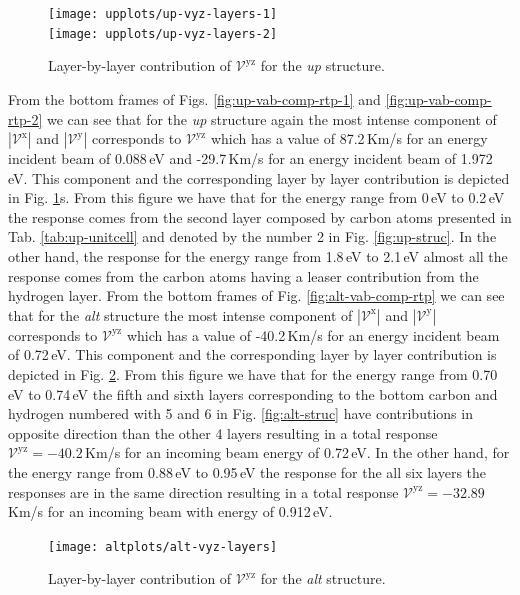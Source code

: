 \documentclass[prb,11pt,tightenlines,twocolumn,aps]{revtex4-1}
\begin{document}
\begin{figure}[t]
    \centering
    \texttt{[image: upplots/up-vyz-layers-1]}
    \label{fig:up-vyz-lay-1}
    \\
    \texttt{[image: upplots/up-vyz-layers-2]}
    \label{fig:up-vyz-lay-2}
    
    \caption{Layer-by-layer contribution of $\mathcal{V}^{\mathrm{yz}}$ for the
     \emph{up} structure.}
    \label{fig:up-vyz-lay}
\end{figure}

From the bottom frames of Figs. \ref{fig:up-vab-comp-rtp-1} and 
% 
\ref{fig:up-vab-comp-rtp-2} we can see that for the \emph{up} structure again
the most intense component of $|\mathcal{V}^{\mathrm{x}}|$ and
$|\mathcal{V}^{\mathrm{y}}|$ corresponds to $\mathcal{V}^{\mathrm{yz}}$ which
has a value of 87.2\,Km/s for an energy incident beam of 0.088\,eV and
-29.7\,Km/s for an energy incident beam of 1.972\,eV. This component and the
corresponding layer by layer contribution is depicted in Fig. 
\ref{fig:up-vyz-lay}s.
% 
From this figure we have that for the energy range from 0\,eV to 0.2\,eV the
response comes from the second layer composed by carbon atoms presented in Tab.
\ref{tab:up-unitcell} and denoted by the number 2 in Fig. \ref{fig:up-struc}. In
the other hand, the response for the energy range from 1.8\,eV to 2.1\,eV almost
all the response comes from the carbon atoms having a leaser contribution from
the hydrogen layer.
From the bottom frames of Fig. \ref{fig:alt-vab-comp-rtp} we can see that for
the \emph{alt} structure the most intense component of
$|\mathcal{V}^{\mathrm{x}}|$ and $|\mathcal{V}^{\mathrm{y}}|$ corresponds to
$\mathcal{V}^{\mathrm{yz}}$ which has a value of -40.2\,Km/s for an
energy incident beam of 0.72\,eV. This component and the corresponding layer by
layer contribution is depicted in Fig. \ref{fig:alt-vyz-lay}. From this figure
we have that for the energy range from 0.70\,eV to 0.74\,eV the fifth and sixth
layers corresponding to the bottom carbon and hydrogen numbered with 5 and 6 in
Fig. \ref{fig:alt-struc} have contributions in opposite direction than the other
4 layers resulting in a total response $\mathcal{V}^{\mathrm{yz}}= -40.2$\,Km/s
for an incoming beam energy of 0.72\,eV. In the other hand, for the energy range
from 0.88\,eV to 0.95\,eV the response for the all six layers the responses are
in the same direction resulting in a total response
$\mathcal{V}^{\mathrm{yz}}=-32.89$\,Km/s for an incoming beam with energy of
0.912\,eV.
\begin{figure}[b]
    \centering
    \texttt{[image: altplots/alt-vyz-layers]}
    
    \caption{Layer-by-layer contribution of $\mathcal{V}^{\mathrm{yz}}$ for the
     \emph{alt} structure.}
    \label{fig:alt-vyz-lay}
\end{figure}



\end{document}
